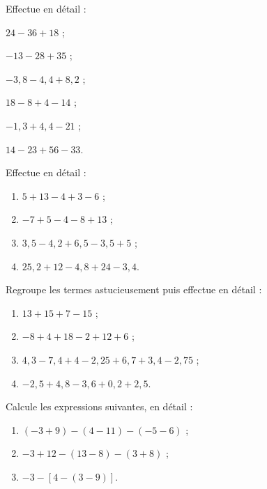\begin{exercice}
Effectue en détail :
\begin{colenumerate}{2}
 \item $24 - 36 + 18$ ;
 \item $-13 - 28 + 35$ ;
 \item $-3,8 - 4,4 + 8,2$ ;
 \item $18 - 8 + 4 - 14$ ;
 \item $-1,3 + 4,4 - 21$ ;
 \item $14 - 23 + 56 - 33$.
 \end{colenumerate}
\end{exercice}


\begin{exercice}
Effectue en détail :
\begin{enumerate}
 \item $5 + 13 - 4 + 3 - 6$ ;
 \item $-7 + 5 - 4 - 8 + 13$ ;
 \item $3,5 - 4,2 + 6,5 - 3,5 + 5$ ;
 \item $25,2 + 12 - 4,8 + 24 - 3,4$.
 \end{enumerate}
\end{exercice}


\begin{exercice}
Regroupe les termes astucieusement puis effectue en détail :
\begin{enumerate}
 \item $13 + 15 + 7 - 15$ ;
 \item $-8 + 4 + 18 - 2 + 12 + 6$ ;
 \item $4,3 - 7,4 + 4 - 2,25 + 6,7 + 3,4 - 2,75$ ;
 \item $-2,5 + 4,8 - 3,6 + 0,2 + 2,5$.
 \end{enumerate}
\end{exercice}


\begin{exercice}
Calcule les expressions suivantes, en détail :
\begin{enumerate}
 \item $(-3 + 9) - (4 - 11) - (-5 - 6)$ ;
 \item $-3 + 12 - (13 - 8) - (3 + 8)$ ;
 \item $-3 - [4 - (3 - 9)]$.
 \end{enumerate}
\end{exercice}


